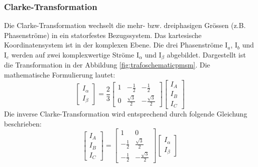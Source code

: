 \subsubsection*{Clarke-Transformation}
Die Clarke-Transformation wechselt die mehr- bzw. dreiphasigen Grössen (z.B. Phasenströme) in ein statorfestes Bezugssystem\cite{ClarkeTrafo_Wiki}. Das kartesische Koordinatensystem ist in der komplexen Ebene. Die drei Phasenströme I$_{a}$, I$_{b}$ und I$_{c}$ werden auf zwei komplexwertige Ströme I$_{\alpha}$ und I$_{\beta}$ abgebildet. Dargestellt ist die Transformation in der Abbildung \ref{fig:trafoschematicpmsm}.
Die mathematische Formulierung lautet:
\begin{equation}\label{ClarkeTrafo}
\left[
\begin{array}{c}
I_\alpha \\ 
I_\beta
\end{array} 
\right]
= \frac{2}{3}
\left[
\begin{array}{ccc}
1 & -\frac{1}{2} & -\frac 12 \\ 
0 & \frac{\sqrt{3}}{2} & -\frac{\sqrt{3}}{2}
\end{array} 
\right] 
\left[
\begin{array}{c}
I_A \\ 
I_B \\
I_C
\end{array} 
\right]
\end{equation}
Die inverse Clarke-Transformation wird entsprechend durch folgende Gleichung beschrieben:
\begin{equation}\label{invClarkeTrafo}
\left[
\begin{array}{c}
I_A \\ 
I_B \\
I_C
\end{array} 
\right]
= 
\left[
\begin{array}{cc}
1 & 0 \\
-\frac{1}{2} & \frac{\sqrt{3}}{2} \\
-\frac 12  & -\frac{\sqrt{3}}{2}
\end{array} 
\right] 
\left[
\begin{array}{c}
I_\alpha \\ 
I_\beta
\end{array} 
\right]
\end{equation}


